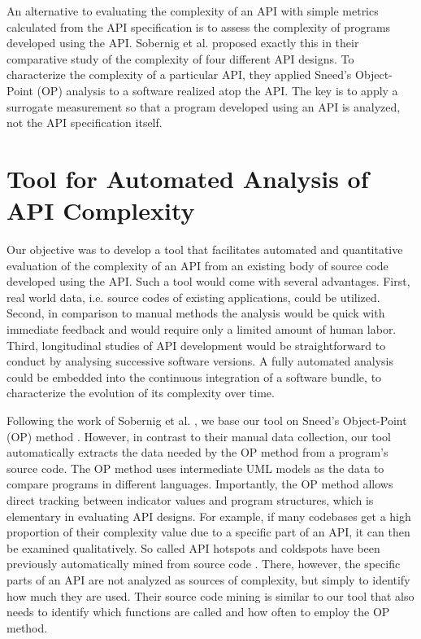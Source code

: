 \documentclass[conference]{IEEEtran}
\begin{document}
An alternative to evaluating the complexity of an API with simple
metrics calculated from the API specification is to assess the
complexity of programs developed using the API. Sobernig et
al. \cite{api-complexity-analysis} proposed exactly this in their
comparative study of the complexity of four different API designs. To
characterize the complexity of a particular API, they applied Sneed’s
\cite{Sneed} Object-Point (OP) analysis to a software realized atop the
API. The key is to apply a surrogate measurement so that a program
developed using an API is analyzed, not the API specification itself.


\section{Tool for Automated Analysis of API Complexity%
  \label{tool-for-automated-analysis-of-api-complexity}%
}

Our objective was to develop a tool that facilitates automated and
quantitative evaluation of the complexity of an API from an existing
body of source code developed using the API. Such a tool would come
with several advantages. First, real world data, i.e. source codes of
existing applications, could be utilized. Second, in comparison to
manual methods the analysis would be quick with immediate feedback and
would require only a limited amount of human labor. Third,
longitudinal studies of API development would be straightforward to
conduct by analysing successive software versions. A fully automated
analysis could be embedded into the continuous integration of a
software bundle, to characterize the evolution of its complexity over
time.

Following the work of Sobernig et al. \cite{api-complexity-analysis}, we
base our tool on Sneed’s Object-Point (OP) method \cite{Sneed}. However, in
contrast to their manual data collection, our tool automatically
extracts the data needed by the OP method from a program’s source
code. The OP method uses intermediate UML models as the data to
compare programs in different languages. Importantly, the OP method
allows direct tracking between indicator values and program
structures, which is elementary in evaluating API designs. For
example, if many codebases get a high proportion of their complexity
value due to a specific part of an API, it can then be examined
qualitatively. So called API hotspots and coldspots have been
previously automatically mined from source code \cite{spotweb}. There,
however, the specific parts of an API are not analyzed as sources of
complexity, but simply to identify how much they are used. Their
source code mining is similar to our tool that also needs to identify
which functions are called and how often to employ the OP method.
\end{document}
